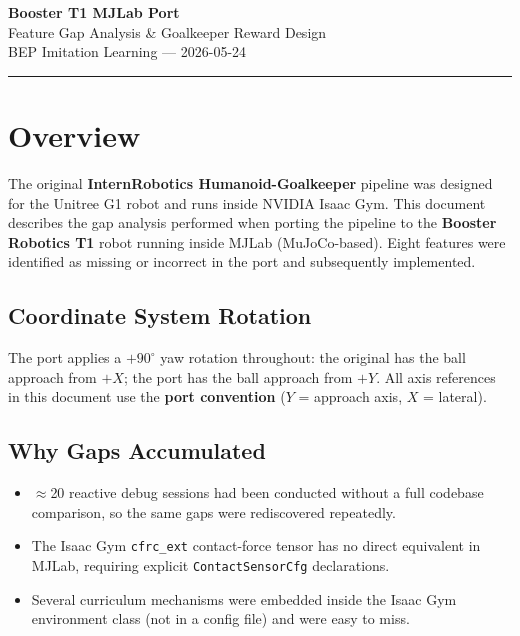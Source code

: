 \documentclass[11pt,a4paper]{article}
\begin{document}
\begin{center}
  {\LARGE\bfseries Booster T1 MJLab Port}\\[0.4em]
  {\large Feature Gap Analysis \& Goalkeeper Reward Design}\\[0.3em]
  {\normalsize BEP Imitation Learning --- 2026-05-24}
\end{center}

\vspace{0.5em}
\hrule
\vspace{1em}

\tableofcontents
\clearpage

\section{Overview}

The original \textbf{InternRobotics Humanoid-Goalkeeper} pipeline was designed for
the Unitree G1 robot and runs inside NVIDIA Isaac Gym. This document describes the
gap analysis performed when porting the pipeline to the \textbf{Booster Robotics T1}
robot running inside MJLab (MuJoCo-based). Eight features were identified as missing
or incorrect in the port and subsequently implemented.

\subsection{Coordinate System Rotation}

The port applies a $+90^\circ$ yaw rotation throughout: the original has the ball
approach from $+X$; the port has the ball approach from $+Y$. All axis references
in this document use the \textbf{port convention} ($Y$ = approach axis, $X$ = lateral).

\subsection{Why Gaps Accumulated}

\begin{itemize}[nosep]
  \item $\approx$20 reactive debug sessions had been conducted without a full
        codebase comparison, so the same gaps were rediscovered repeatedly.
  \item The Isaac Gym \texttt{cfrc\_ext} contact-force tensor has no direct
        equivalent in MJLab, requiring explicit \texttt{ContactSensorCfg}
        declarations.
  \item Several curriculum mechanisms were embedded inside the Isaac Gym
        environment class (not in a config file) and were easy to miss.
\end{itemize}
\end{document}
